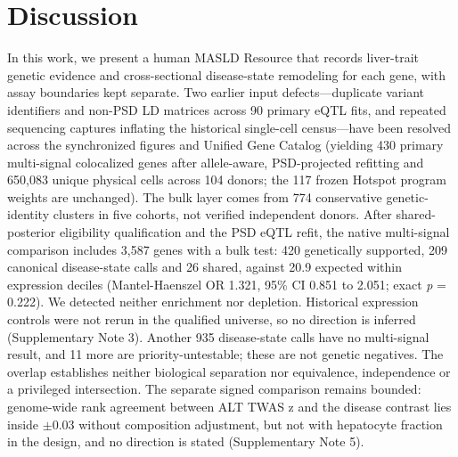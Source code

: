 \section{Discussion}\label{discussion}

In this work, we present a human MASLD Resource that records liver-trait genetic evidence and cross-sectional disease-state remodeling for each gene, with assay boundaries kept separate. Two earlier input defects—duplicate variant identifiers and non-PSD LD matrices across 90 primary eQTL fits, and repeated sequencing captures inflating the historical single-cell census—have been resolved across the synchronized figures and Unified Gene Catalog (yielding 430 primary multi-signal colocalized genes after allele-aware, PSD-projected refitting and 650,083 unique physical cells across 104 donors; the 117 frozen Hotspot program weights are unchanged). The bulk layer comes from 774 conservative genetic-identity clusters in five cohorts, not verified independent donors. After shared-posterior eligibility qualification and the PSD eQTL refit, the native multi-signal comparison includes 3,587 genes with a bulk test: 420 genetically supported, 209 canonical disease-state calls and 26 shared, against 20.9 expected within expression deciles (Mantel-Haenszel OR 1.321, 95\% CI 0.851 to 2.051; exact \emph{p} = 0.222). We detected neither enrichment nor depletion. Historical expression controls were not rerun in the qualified universe, so no direction is inferred (Supplementary Note 3). Another 935 disease-state calls have no multi-signal result, and 11 more are priority-untestable; these are not genetic negatives. The overlap establishes neither biological separation nor equivalence, independence or a privileged intersection. The separate signed comparison remains bounded: genome-wide rank agreement between ALT TWAS z and the disease contrast lies inside $\pm$0.03 without composition adjustment, but not with hepatocyte fraction in the design, and no direction is stated (Supplementary Note 5).

